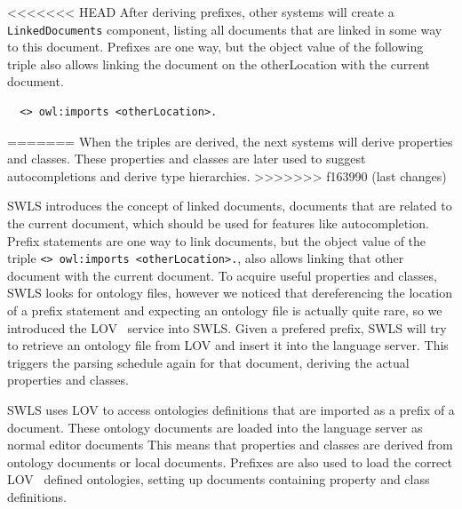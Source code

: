 <<<<<<< HEAD
After deriving prefixes, other systems will create a \texttt{LinkedDocuments} component, listing all documents that are linked in some way to this document.
Prefixes are one way, but the object value of the following triple also allows linking the document on the otherLocation with the current document.
\begin{verbatim}
  <> owl:imports <otherLocation>.
\end{verbatim} 
=======
When the triples are derived, the next systems will derive properties and classes.
These properties and classes are later used to suggest autocompletions and derive type hierarchies.
>>>>>>> f163990 (last changes)

SWLS introduces the concept of linked documents, documents that are related to the current document, which should be used for features like autocompletion.
Prefix statements are one way to link documents, but the object value of the triple \texttt{<> owl:imports <otherLocation>.}, also allows linking that other document with the current document.
To acquire useful properties and classes, SWLS looks for ontology files, however we noticed that dereferencing the location of a prefix statement and expecting an ontology file is actually quite rare, 
so we introduced the LOV~\cite{LOV2017} service into SWLS.
Given a prefered prefix, SWLS will try to retrieve an ontology file from LOV and insert it into the language server.
This triggers the parsing schedule again for that document, deriving the actual properties and classes.

SWLS uses LOV\cite{LOV2017} to access ontologies definitions that are imported as a prefix of a document.
These ontology documents are loaded into the language server as normal editor documents
This means that properties and classes are derived from ontology documents or local documents.
Prefixes are also used to load the correct LOV~\cite{LOV2017} defined ontologies, setting up documents containing property and class definitions.~

